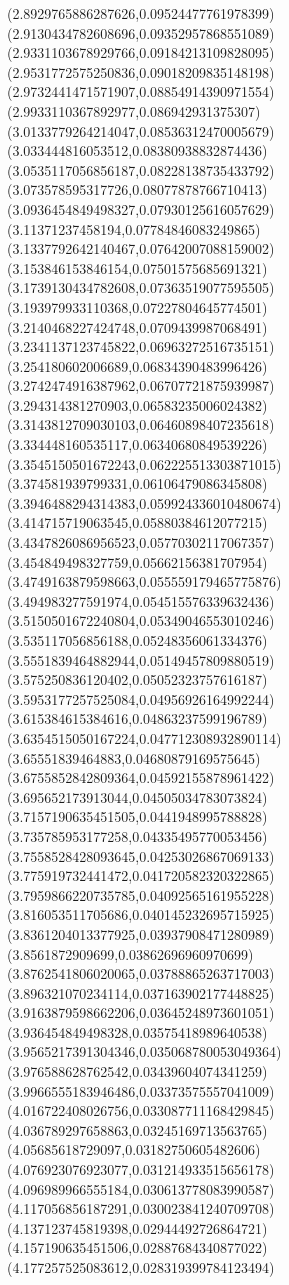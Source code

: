 {(2.8929765886287626,0.09524477761978399)
(2.9130434782608696,0.09352957868551089)
(2.9331103678929766,0.09184213109828095)
(2.9531772575250836,0.09018209835148198)
(2.9732441471571907,0.08854914390971554)
(2.9933110367892977,0.086942931375307)
(3.0133779264214047,0.08536312470005679)
(3.033444816053512,0.08380938832874436)
(3.0535117056856187,0.08228138735433792)
(3.073578595317726,0.08077878766710413)
(3.0936454849498327,0.07930125616057629)
(3.11371237458194,0.07784846083249865)
(3.1337792642140467,0.07642007088159002)
(3.153846153846154,0.07501575685691321)
(3.1739130434782608,0.07363519077595505)
(3.193979933110368,0.07227804645774501)
(3.2140468227424748,0.0709439987068491)
(3.2341137123745822,0.06963272516735151)
(3.254180602006689,0.06834390483996426)
(3.2742474916387962,0.06707721875939987)
(3.294314381270903,0.06583235006024382)
(3.3143812709030103,0.06460898407235618)
(3.334448160535117,0.06340680849539226)
(3.3545150501672243,0.062225513303871015)
(3.374581939799331,0.06106479086345808)
(3.3946488294314383,0.059924336010480674)
(3.414715719063545,0.05880384612077215)
(3.4347826086956523,0.05770302117067357)
(3.454849498327759,0.05662156381707954)
(3.4749163879598663,0.055559179465775876)
(3.494983277591974,0.054515576339632436)
(3.5150501672240804,0.05349046553010246)
(3.535117056856188,0.05248356061334376)
(3.5551839464882944,0.05149457809880519)
(3.575250836120402,0.05052323757616187)
(3.5953177257525084,0.04956926164992244)
(3.615384615384616,0.04863237599196789)
(3.6354515050167224,0.047712308932890114)
(3.65551839464883,0.04680879169575645)
(3.6755852842809364,0.04592155878961422)
(3.695652173913044,0.04505034783073824)
(3.7157190635451505,0.0441948995788828)
(3.735785953177258,0.04335495770053456)
(3.7558528428093645,0.04253026867069133)
(3.775919732441472,0.041720582320322865)
(3.7959866220735785,0.04092565161955228)
(3.816053511705686,0.040145232695715925)
(3.8361204013377925,0.03937908471280989)
(3.8561872909699,0.03862696960970699)
(3.8762541806020065,0.03788865263717003)
(3.896321070234114,0.037163902177448825)
(3.9163879598662206,0.03645248973601051)
(3.936454849498328,0.03575418989640538)
(3.9565217391304346,0.035068780053049364)
(3.976588628762542,0.03439604074341259)
(3.9966555183946486,0.03373575557041009)
(4.016722408026756,0.033087711168429845)
(4.036789297658863,0.03245169713563765)
(4.05685618729097,0.03182750605482606)
(4.076923076923077,0.031214933515656178)
(4.096989966555184,0.030613778083990587)
(4.117056856187291,0.030023841240709708)
(4.137123745819398,0.02944492726864721)
(4.157190635451506,0.02887684340877022)
(4.177257525083612,0.028319399784123494)
}
